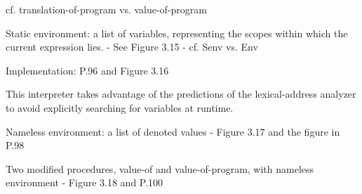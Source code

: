 \documentclass{article}
\begin{document}
\begin{huge}
cf. translation-of-program vs. value-of-program

Static environment: a list of variables, representing the scopes within
which the current expression lies. \al
- See Figure 3.15 \al
- cf. Senv vs. Env

Implementation: P.96 and Figure 3.16


This interpreter takes advantage of the predictions of the lexical-address
analyzer to avoid explicitly searching for variables at runtime.

Nameless environment: a list of denoted values \al
- Figure 3.17 and the figure in P.98

Two modified procedures, value-of and value-of-program, 
with nameless environment \al
- Figure 3.18 and P.100

\end{huge}
\end{document}
